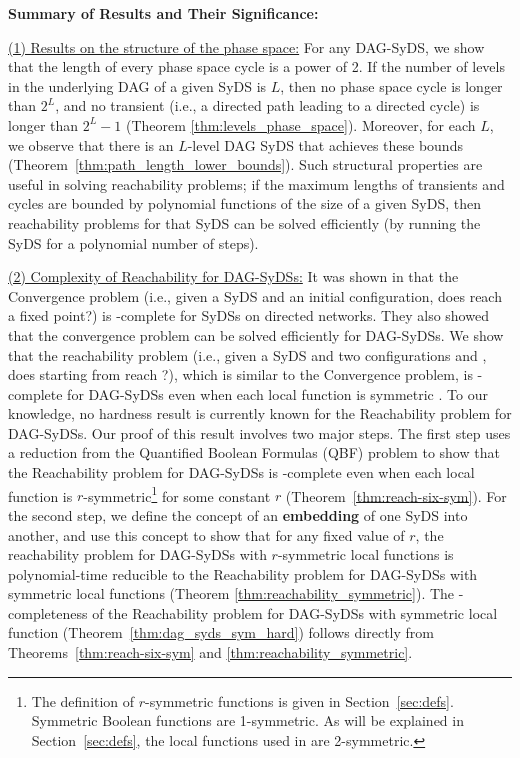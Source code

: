 \smallskip

\noindent
\textbf{Summary of Results and Their Significance:}

\smallskip

\noindent
\underline{(1) Results on the structure of the phase space:}
For any DAG-SyDS, we show that
the length of every phase space cycle is a power of 2.
If the number of levels in the underlying DAG of a given SyDS is $L$,
then no phase space cycle is longer than $2^L$,
and no transient (i.e., a directed path leading to a directed
cycle) is longer than $2^L-1$
(Theorem \ref{thm:levels_phase_space}).
Moreover, for each $L$, we observe that
there is an $L$-level DAG SyDS that achieves these bounds 
(Theorem~\ref{thm:path_length_lower_bounds}).
Such structural properties are useful in solving 
reachability problems; if the maximum lengths of transients
and cycles are bounded by polynomial functions of the size of a given SyDS,
then reachability problems for that SyDS can be solved efficiently
(by running the SyDS for a polynomial number of steps).

\smallskip

\noindent
\underline{(2) Complexity of Reachability for DAG-SyDSs:}
It was shown in
\cite{Chistikov-etal-2020} that the Convergence problem
(i.e., given a SyDS \cals{} and an initial configuration,
does \cals{} reach a fixed point?) is \cpsp-complete
for SyDSs on directed networks.
They also showed that the convergence problem can be solved efficiently
for DAG-SyDSs.
We show that the reachability problem
(i.e., given a SyDS \cals{} and two configurations \calc{} and \cald{},
does \cals{} starting from \calc{} reach \cald{}?),
which is similar to the Convergence problem, 
is \cpsp-complete for DAG-SyDSs even
when each local function is symmetric \cite{Crama-Hammer-2011}.
To our knowledge, no hardness result is currently known for
the Reachability problem for DAG-SyDSs.
Our proof of this result involves two major steps.
The first step uses a reduction from the Quantified Boolean Formulas
(QBF) problem \cite{GJ-1979} to show that the Reachability problem for DAG-SyDSs is
\cpsp-complete even when each local function is 
$r$-symmetric\footnote{The definition of $r$-symmetric functions is given in
Section~\ref{sec:defs}. Symmetric Boolean functions
are 1-symmetric. As will be explained in Section~\ref{sec:defs},
the local functions used in \cite{Chistikov-etal-2020} are
2-symmetric.}
for some constant $r$ (Theorem~\ref{thm:reach-six-sym}).
For the second step,
we define the concept of an \textbf{embedding} of one SyDS into another,
and use this concept to show that
for any fixed value of $r$, 
the reachability problem for DAG-SyDSs with $r$-symmetric local functions 
is polynomial-time reducible to the Reachability problem for DAG-SyDSs with
symmetric  local functions (Theorem \ref{thm:reachability_symmetric}).
The \cpsp-completeness of the Reachability problem for DAG-SyDSs with 
symmetric local function (Theorem~\ref{thm:dag_syds_sym_hard})
follows directly from Theorems~\ref{thm:reach-six-sym} and 
\ref{thm:reachability_symmetric}.

